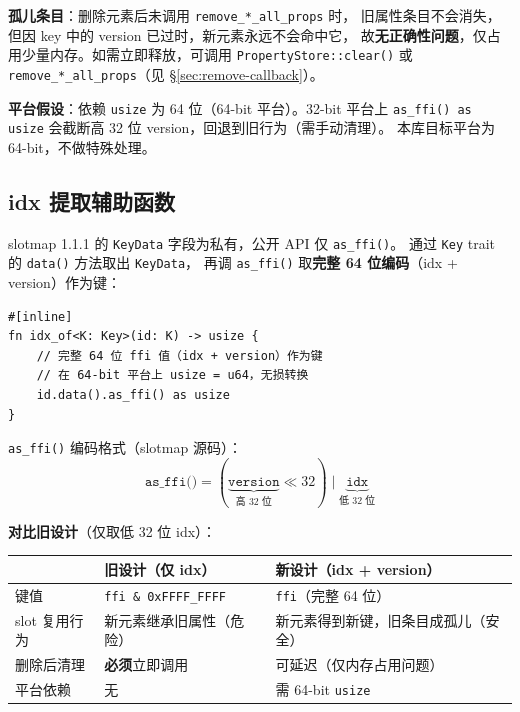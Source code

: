 \documentclass[11pt,a4paper]{article}
\begin{document}
\textbf{孤儿条目}：删除元素后未调用 \texttt{remove\_*\_all\_props} 时，
旧属性条目不会消失，但因 key 中的 version 已过时，新元素永远不会命中它，
故\textbf{无正确性问题}，仅占用少量内存。如需立即释放，可调用
\texttt{PropertyStore::clear()} 或 \texttt{remove\_*\_all\_props}（见 \S\ref{sec:remove-callback}）。

\textbf{平台假设}：依赖 \texttt{usize} 为 64 位（64-bit 平台）。32-bit 平台上
\texttt{as\_ffi() as usize} 会截断高 32 位 version，回退到旧行为（需手动清理）。
本库目标平台为 64-bit，不做特殊处理。

\subsection{idx 提取辅助函数}

slotmap 1.1.1 的 \texttt{KeyData} 字段为私有，公开 API 仅 \texttt{as\_ffi()}。
通过 \texttt{Key} trait 的 \texttt{data()} 方法取出 \texttt{KeyData}，
再调 \texttt{as\_ffi()} 取\textbf{完整 64 位编码}（idx + version）作为键：

\begin{lstlisting}
#[inline]
fn idx_of<K: Key>(id: K) -> usize {
    // 完整 64 位 ffi 值（idx + version）作为键
    // 在 64-bit 平台上 usize = u64，无损转换
    id.data().as_ffi() as usize
}
\end{lstlisting}

\texttt{as\_ffi()} 编码格式（slotmap 源码）：
\[
\texttt{as\_ffi()} = (\underbrace{\texttt{version}}_{\text{高 32 位}} \ll 32)\;\big|\;\underbrace{\texttt{idx}}_{\text{低 32 位}}
\]

\textbf{对比旧设计}（仅取低 32 位 idx）：
\begin{center}
\renewcommand{\arraystretch}{1.20}
\begin{tabular}{@{}lll@{}}
  \toprule
  \textbf{} & \textbf{旧设计（仅 idx）} & \textbf{新设计（idx + version）} \\
  \midrule
  键值          & \texttt{ffi \& 0xFFFF\_FFFF} & \texttt{ffi}（完整 64 位） \\
  slot 复用行为 & 新元素继承旧属性（危险）       & 新元素得到新键，旧条目成孤儿（安全） \\
  删除后清理    & \textbf{必须}立即调用         & 可延迟（仅内存占用问题） \\
  平台依赖      & 无                            & 需 64-bit \texttt{usize} \\
  \bottomrule
\end{tabular}
\end{center}
\end{document}
